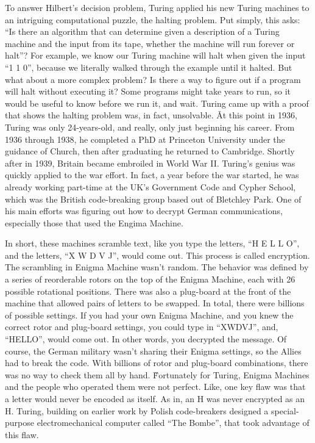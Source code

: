 To answer Hilbert's decision problem, Turing applied his new Turing machines to an intriguing computational puzzle,
the halting problem. Put simply, this asks: ``Is there an algorithm that can determine given a description of a
Turing machine and the input from its tape, whether the machine will run forever or halt''? For example, we know our
Turing machine will halt when given the input ``1 1 0'', because we literally walked through the example until it
halted. But what about a more complex problem? Is there a way to figure out if a program will halt without executing
it? Some programs might take years to run, so it would be useful to know before we run it, and wait. Turing came up
with a proof that shows the halting problem was, in fact, unsolvable. \v

At this point in 1936, Turing was only 24-years-old, and really, only just beginning his career. From 1936 through
1938, he completed a PhD at Princeton University under the guidance of Church, then after graduating he returned to
Cambridge. Shortly after in 1939, Britain became embroiled in World War II. Turing's genius was quickly applied to
the war effort. In fact, a year before the war started, he was already working part-time at the UK's Government Code
and Cypher School, which was the British code-breaking group based out of Bletchley Park. One of his main efforts was
figuring out how to decrypt German communications, especially those that used the Engima Machine.


In short, these machines scramble text, like you type the letters, ``H E L L O'', and the letters, ``X W D V J'',
would come out. This process is called encryption. The scrambling in Enigma Machine wasn't random. The behavior was
defined by a series of reorderable rotors on the top of the Enigma Machine, each with 26 possible rotational
positions. There was also a plug-board at the front of the machine that allowed pairs of letters to be swapped. In
total, there were billions of possible settings. If you had your own Enigma Machine, and you knew the correct rotor
and plug-board settings, you could type in ``XWDVJ'', and, ``HELLO'', would come out. In other words, you decrypted
the message. Of course, the German military wasn't sharing their Enigma settings, so the Allies had to break the code.
With billions of rotor and plug-board combinations, there was no way to check them all by hand. \v

Fortunately for Turing, Enigma Machines and the people who operated them were not perfect. Like, one key flaw was
that a letter would never be encoded as itself. As in, an H was never encrypted as an H. Turing, building on earlier
work by Polish code-breakers designed a special-purpose electromechanical computer called ``The Bombe'', that took
advantage of this flaw.

